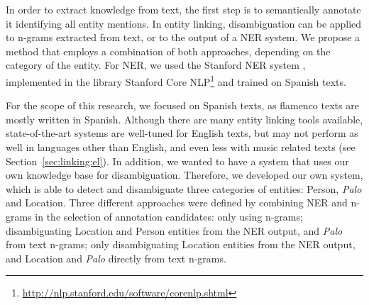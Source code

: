 In order to extract knowledge from text, the first step is to semantically annotate it identifying all entity mentions. %
In entity linking, disambiguation can be applied to n-grams extracted from text, or to the output of a NER system. We propose a method that employs a combination of both approaches, depending on the category of the entity. For NER, we used the Stanford NER system \citep{Finkel2005}, implemented in the library Stanford Core NLP\footnote{\url{http://nlp.stanford.edu/software/corenlp.shtml}} and trained on Spanish texts. %

For the scope of this research, we focused on Spanish texts, as flamenco texts are mostly written in Spanish. Although there are many entity linking tools available, state-of-the-art systems are well-tuned for English texts, but may not perform as well in languages other than English, and even less with music related texts (see Section~\ref{sec:linking:el}). In addition, we wanted to have a system that uses our own knowledge base for disambiguation. Therefore, we developed our own system, which is able to detect and disambiguate three categories of entities: Person, \textit{Palo} and Location. Three different approaches were defined by combining NER and n-grams in the selection of annotation candidates: only using n-grams; disambiguating Location and Person entities from the NER output, and \textit{Palo} from text n-grams; only disambiguating Location entities from the NER output, and Location and \textit{Palo} directly from text n-grams.

